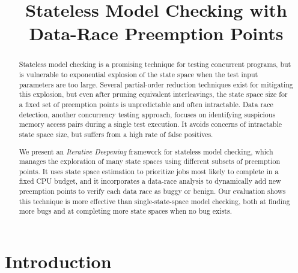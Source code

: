 \documentclass[pldi]{sigplanconf-pldi15}
\begin{document}
%
%

\newcommand\landslide{\textsc{Landslide}}
\newcommand\quicksand{\textsc{Quicksand}}

\title{Stateless Model Checking with Data-Race Preemption Points}

\maketitle
\begin{abstract}
Stateless model checking is a promising technique for testing concurrent programs,
but is vulnerable to exponential explosion of the state space when the test input parameters are too large.
Several partial-order reduction techniques exist for mitigating this explosion,
but even after pruning equivalent interleavings, the state space size for a fixed set of preemption points is unpredictable and often intractable.
%
Data race detection, another concurrency testing approach, focuses on identifying suspicious memory access pairs during a single test execution.
It avoids concerns of intractable state space size, but suffers from a high rate of false positives.

We present an {\em Iterative Deepening} framework for stateless model checking,
which manages the exploration of many state spaces using different subsets of preemption points.
It uses state space estimation to prioritize jobs most likely to complete in a fixed CPU budget,
and it incorporates a data-race analysis to dynamically add new preemption points to verify each data race as buggy or benign.
%
Our evaluation shows this technique is
more effective than single-state-space model checking, both at finding more bugs and at completing more state spaces when no bug exists.

\end{abstract}

\section{Introduction}
\end{document}
